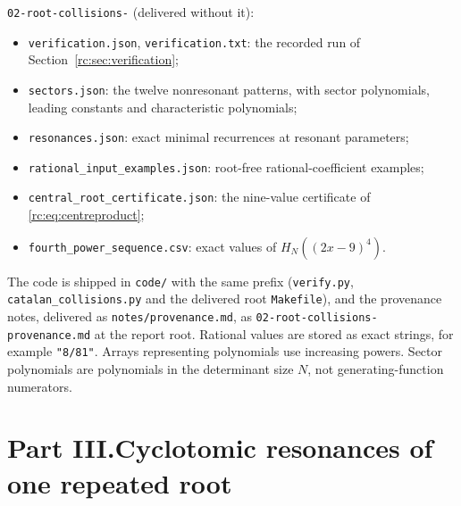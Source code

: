 \documentclass[11pt,a4paper]{article}
\numberwithin{equation}{section}
\theoremstyle{definition}
\theoremstyle{remark}
\begin{document}
\texttt{02-root-collisions-} (delivered without it):
\begin{itemize}[itemsep=0pt,topsep=2pt]
\item \nolinkurl{verification.json}, \nolinkurl{verification.txt}: the
 recorded run of Section~\ref{rc:sec:verification};
\item \nolinkurl{sectors.json}: the twelve nonresonant patterns, with
 sector polynomials, leading constants and characteristic polynomials;
\item \nolinkurl{resonances.json}: exact minimal recurrences at resonant
 parameters;
\item \nolinkurl{rational_input_examples.json}: root-free
 rational-coefficient examples;
\item \nolinkurl{central_root_certificate.json}: the nine-value
 certificate of \eqref{rc:eq:centreproduct};
\item \nolinkurl{fourth_power_sequence.csv}: exact values of
 $H_N((2x-9)^4)$.
\end{itemize}
The code is shipped in \nolinkurl{code/} with the same prefix
(\nolinkurl{verify.py}, \nolinkurl{catalan_collisions.py} and the
delivered root \nolinkurl{Makefile}), and the provenance notes, delivered
as \nolinkurl{notes/provenance.md}, as
\nolinkurl{02-root-collisions-provenance.md} at the report root.
Rational values are stored as
exact strings, for example \texttt{"8/81"}.  Arrays representing
polynomials use increasing powers.  Sector polynomials are polynomials
in the determinant size $N$, not generating-function numerators.

\clearpage
{}\part*{Part III.\quad Cyclotomic resonances of one repeated root}
\end{document}
